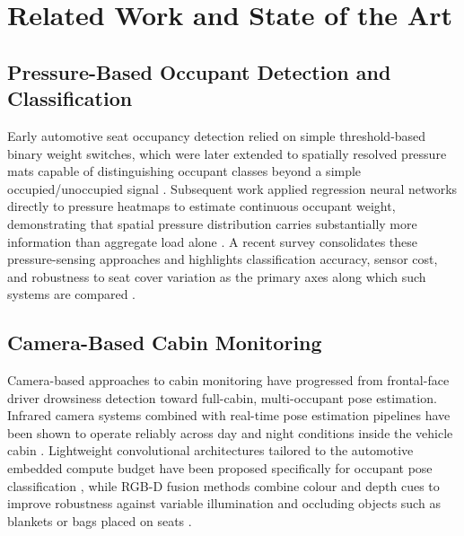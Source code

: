 \chapter{Related Work and State of the Art}
\label{ch:related-work}

\section{Pressure-Based Occupant Detection and Classification}
\label{sec:related-pressure}
Early automotive seat occupancy detection relied on simple threshold-based
binary weight switches, which were later extended to spatially resolved
pressure mats capable of distinguishing occupant classes beyond a simple
occupied/unoccupied signal \cite{mueller2019pressure}. Subsequent work
applied regression neural networks directly to pressure heatmaps to
estimate continuous occupant weight, demonstrating that spatial pressure
distribution carries substantially more information than aggregate load
alone \cite{nakamura2021weight}. A recent survey consolidates these
pressure-sensing approaches and highlights classification accuracy,
sensor cost, and robustness to seat cover variation as the primary axes
along which such systems are compared \cite{fernandez2022occupant}.

\section{Camera-Based Cabin Monitoring}
\label{sec:related-camera}
Camera-based approaches to cabin monitoring have progressed from
frontal-face driver drowsiness detection toward full-cabin, multi-occupant
pose estimation. Infrared camera systems combined with real-time pose
estimation pipelines have been shown to operate reliably across day and
night conditions inside the vehicle cabin \cite{schmidt2020driver}.
Lightweight convolutional architectures tailored to the automotive
embedded compute budget have been proposed specifically for occupant pose
classification \cite{patel2021occupant}, while RGB-D fusion methods
combine colour and depth cues to improve robustness against variable
illumination and occluding objects such as blankets or bags placed on
seats \cite{kowalski2023rgbd}.

